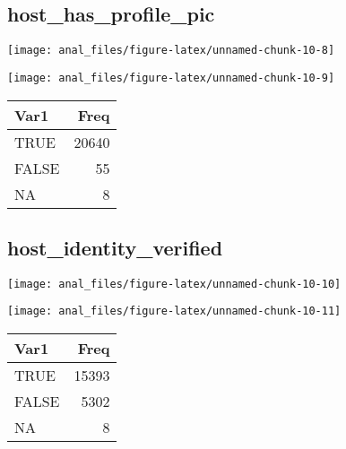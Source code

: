 \pagebreak

\centering

\hypertarget{host_has_profile_pic}{%
\subsection{host\_has\_profile\_pic}\label{host_has_profile_pic}}

\begin{center}\texttt{[image: anal\_files/figure-latex/unnamed-chunk-10-8]} \end{center}

\begin{center}\texttt{[image: anal\_files/figure-latex/unnamed-chunk-10-9]} \end{center}

\begin{table}[H]
\centering
\begin{tabular}[t]{lr}
\toprule
Var1 & Freq\\
\midrule
TRUE & 20640\\
FALSE & 55\\
NA & 8\\
\bottomrule
\end{tabular}
\end{table}
\pagebreak

\centering

\hypertarget{host_identity_verified}{%
\subsection{host\_identity\_verified}\label{host_identity_verified}}

\begin{center}\texttt{[image: anal\_files/figure-latex/unnamed-chunk-10-10]} \end{center}

\begin{center}\texttt{[image: anal\_files/figure-latex/unnamed-chunk-10-11]} \end{center}

\begin{table}[H]
\centering
\begin{tabular}[t]{lr}
\toprule
Var1 & Freq\\
\midrule
TRUE & 15393\\
FALSE & 5302\\
NA & 8\\
\bottomrule
\end{tabular}
\end{table}
\pagebreak

